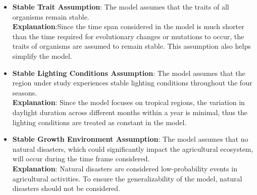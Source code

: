 \documentclass{HZNUMCM}
\begin{document}
\begin{itemize}
        \item \textbf{Stable Trait Assumption}: The model assumes that the traits of all organisms remain stable.\\
        \textbf{Explanation}:Since the time span considered in the model is much shorter than the time required for evolutionary changes or mutations to occur,
         the traits of organisms are assumed to remain stable. This assumption also helps simplify the model.
        
        \item \textbf{Stable Lighting Conditions Assumption}: The model assumes that the region under study experiences stable lighting conditions throughout the four seasons.\\
        \textbf{Explanation}: Since the model focuses on tropical regions, the variation in daylight duration across different months within a year is minimal,
         thus the lighting conditions are treated as constant in the model.
        
        \item \textbf{Stable Growth Environment Assumption}: The model assumes that no natural disasters,
         which could significantly impact the agricultural ecosystem, will occur during the time frame considered.\\
        \textbf{Explanation}: Natural disasters are considered low-probability events in agricultural activities.
         To ensure the generalizability of the model, natural disasters should not be considered.
      \end{itemize}
\end{document}
